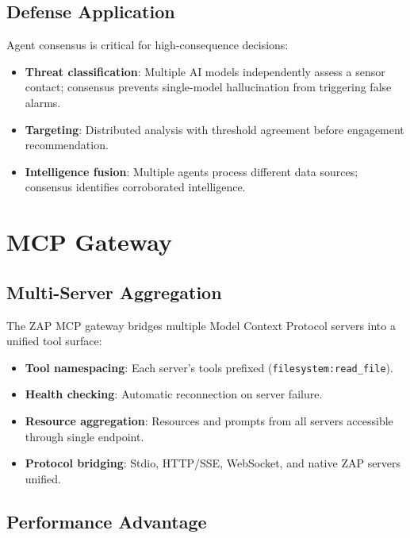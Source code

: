 \documentclass[11pt,letterpaper]{article}
\begin{document}
\subsection{Defense Application}

Agent consensus is critical for high-consequence decisions:

\begin{itemize}
\item \textbf{Threat classification}: Multiple AI models independently assess a sensor contact; consensus prevents single-model hallucination from triggering false alarms.
\item \textbf{Targeting}: Distributed analysis with threshold agreement before engagement recommendation.
\item \textbf{Intelligence fusion}: Multiple agents process different data sources; consensus identifies corroborated intelligence.
\end{itemize}

\section{MCP Gateway}

\subsection{Multi-Server Aggregation}

The ZAP MCP gateway bridges multiple Model Context Protocol servers into a unified tool surface:

\begin{itemize}
\item \textbf{Tool namespacing}: Each server's tools prefixed (\eg \texttt{filesystem:read\_file}).
\item \textbf{Health checking}: Automatic reconnection on server failure.
\item \textbf{Resource aggregation}: Resources and prompts from all servers accessible through single endpoint.
\item \textbf{Protocol bridging}: Stdio, HTTP/SSE, WebSocket, and native ZAP servers unified.
\end{itemize}

\subsection{Performance Advantage}
\end{document}

